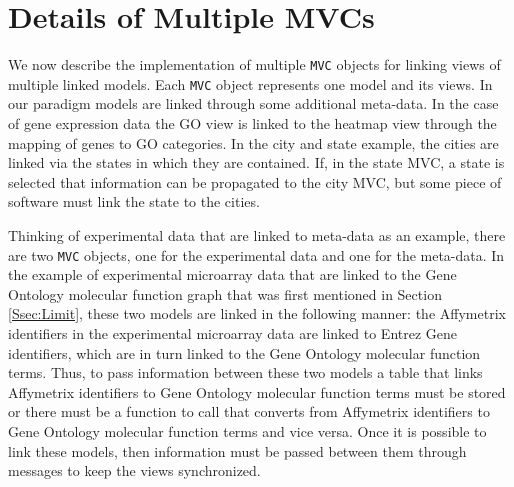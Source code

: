 \documentclass{article}[11pt]
\newcommand{\Robject}[1]{{\texttt{#1}}}
\begin{document}
\section{Details of Multiple MVCs}
\label{Sec:MultMVC}

We now describe the implementation of multiple \Robject{MVC} objects for
linking views of multiple linked models.  Each \Robject{MVC} object
represents one model and its views.  In our
paradigm models are linked through some additional meta-data. In
the case of gene expression data the GO view is linked to the heatmap
view through the mapping of genes to GO categories. In the city and
state example, the cities are linked via the states in which they are
contained. If, in the state MVC, a state is selected that information
can be propagated to the city MVC, but some piece of software must
link the state to the cities. 

Thinking of experimental data that are linked to meta-data as an example, there
are two \Robject{MVC} objects, one for the experimental data and one for the
meta-data.  In the example of experimental microarray data that are linked to
the Gene Ontology molecular function graph that was first mentioned in Section
\ref{Ssec:Limit}, these two models are linked in the following manner: the
Affymetrix identifiers in the experimental microarray data are linked to Entrez
Gene identifiers, which are in turn linked to the Gene Ontology molecular
function terms.  Thus, to pass information between these two models a table
that links Affymetrix identifiers to Gene Ontology molecular function terms
must be stored or there must be a function to call that converts from
Affymetrix identifiers to Gene Ontology molecular function terms and vice
versa.  Once it is possible to link these models, then information must be
passed between them through messages to keep the views synchronized.
\end{document}

